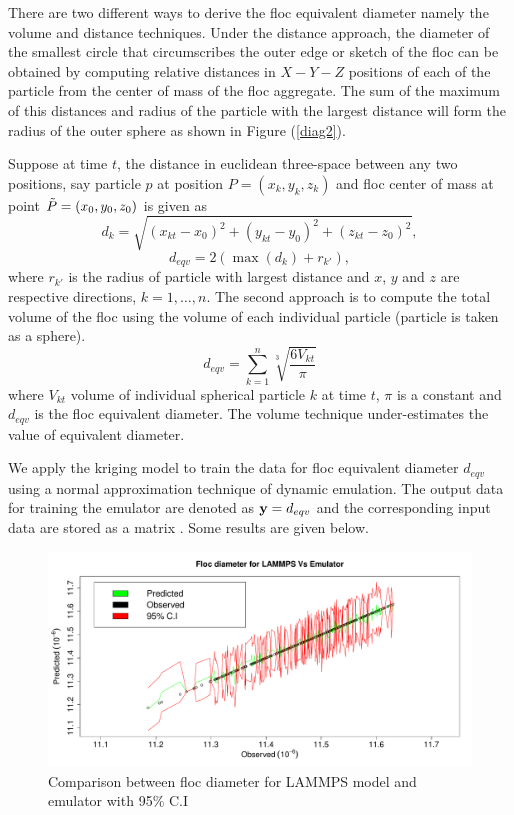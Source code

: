  There are two different ways to derive the floc equivalent diameter namely the volume and distance techniques. Under the distance approach, the diameter of the smallest circle that circumscribes the outer edge or sketch of the floc can be obtained by computing relative distances in $X-Y-Z$ positions of each of the particle from the center of mass of the floc aggregate. The sum of the maximum of this distances and radius of the particle with the largest distance will form the radius of the outer sphere as shown in Figure (\ref{diag2}). 

Suppose at time $t$, the distance in euclidean three-space between any two positions, say particle $p$ at position $P=(x_k,y_k,z_k)$ and floc center of mass at point ${\tilde {P}}=(x_0,y_0,z_0)$ is given as
\begin{equation}
 d_{k}=\sqrt{(x_{kt}-x_0)^2+(y_{kt}-y_0)^2+(z_{kt}-z_0)^2}, 
\end{equation}
\begin{equation}
d_{eqv}=2(\max{(d_{k})}+r_{k'}) ,
\end{equation}
where $r_{k'}$ is the radius of particle with largest distance and $x$, $y$ and $z$ are respective directions, $k=1,\ldots,n$. 
The second approach is to compute the total volume of the floc using the volume of each individual particle (particle is taken as a sphere).
\begin{equation}
d_{eqv}=\sum^n_{k=1} \sqrt[3]{\frac{6V_{kt}}{\pi}}
\end{equation}
where $V_{kt}$ volume of individual spherical particle $k$ at time $t$, $\pi$ is a constant and $d_{eqv}$ is the floc equivalent diameter. The volume technique under-estimates the value of equivalent diameter.

We apply the kriging model to train the data for floc equivalent diameter $d_{eqv}$ using a normal approximation technique of dynamic emulation. The output data for training the emulator are denoted as ${\bf y}=d_{eqv}$ and the corresponding input data are stored as a matrix .
Some results are given below.

\begin{figure}[!ht] 
\includegraphics[width=1.1\textwidth]{result2/plot1}
\caption[]{Comparison between floc diameter for LAMMPS model and emulator with 95\% C.I}\label{diag2d}
\end{figure}

